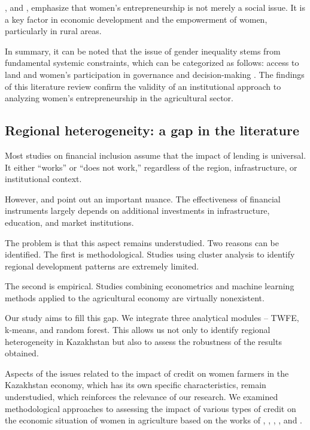 \documentclass[pdflatex,sn-mathphys-ay]{sn-jnl}
\begin{document}
\citet{ref89}, and \citet{ref19},
emphasize that women's entrepreneurship is not merely a social issue. It
is a key factor in economic development and the empowerment of women,
particularly in rural areas.

In summary, it can be noted that the issue of gender inequality stems
from fundamental systemic constraints, which can be categorized as
follows: access to land \citep{ref39,ref06,ref102,ref52,ref12} and women's participation in governance and decision-making
\citep{ref79,ref40,ref08,ref09,ref69}. The findings of this literature review
confirm the validity of an institutional approach to analyzing women's
entrepreneurship in the agricultural sector.

\subsection{Regional heterogeneity: a gap in the literature}

Most studies on financial inclusion assume that the impact of lending is
universal. It either ``works'' or ``does not work,'' regardless of the
region, infrastructure, or institutional context.

However, \citet{ref21} and \citet{ref17}
point out an important nuance. The effectiveness of financial
instruments largely depends on additional investments in infrastructure,
education, and market institutions.

The problem is that this aspect remains understudied. Two reasons can be
identified. The first is methodological. Studies using cluster analysis
to identify regional development patterns are extremely limited.

The second is empirical. Studies combining econometrics and machine
learning methods applied to the agricultural economy are virtually
nonexistent.

Our study aims to fill this gap. We integrate three analytical modules
-- TWFE, k-means, and random forest. This allows us not only to identify
regional heterogeneity in Kazakhstan but also to assess the robustness
of the results obtained.

Aspects of the issues related to the impact of credit on women farmers
in the Kazakhstan economy, which has its own specific characteristics,
remain understudied, which reinforces the relevance of our research. We
examined methodological approaches to assessing the impact of various
types of credit on the economic situation of women in agriculture based
on the works of \citet{ref10}, \citet{ref03}, \citet{ref30}, \citet{ref41}, and \citet{ref59}.
\end{document}

